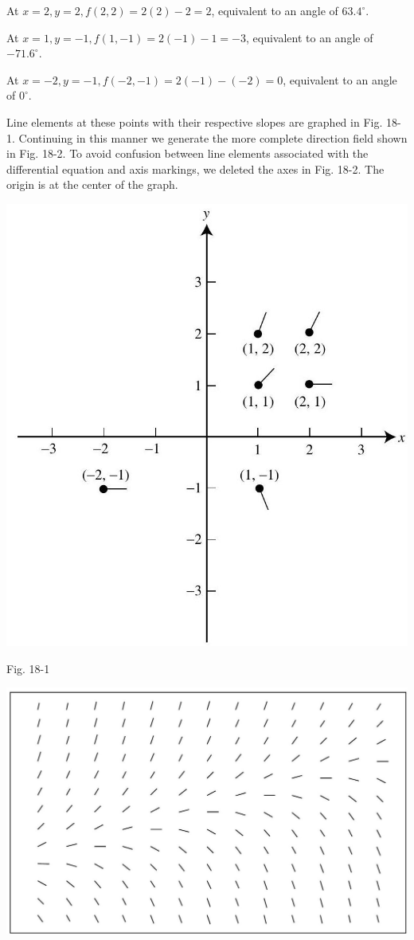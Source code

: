 \documentclass[10pt]{article}
\begin{document}
At $x=2, y=2, f(2,2)=2(2)-2=2$, equivalent to an angle of $63.4^{\circ}$.

At $x=1, y=-1, f(1,-1)=2(-1)-1=-3$, equivalent to an angle of $-71.6^{\circ}$.

At $x=-2, y=-1, f(-2,-1)=2(-1)-(-2)=0$, equivalent to an angle of $0^{\circ}$.

Line elements at these points with their respective slopes are graphed in Fig. 18-1. Continuing in this manner we generate the more complete direction field shown in Fig. 18-2. To avoid confusion between line elements associated with the differential equation and axis markings, we deleted the axes in Fig. 18-2. The origin is at the center of the graph.

\begin{center}
\includegraphics[max width=\textwidth]{2024_04_03_5bb5b4275a64cb9887d1g-177}
\end{center}

Fig. 18-1

\begin{center}
\includegraphics[max width=\textwidth]{2024_04_03_5bb5b4275a64cb9887d1g-177(1)}
\end{center}
\end{document}
